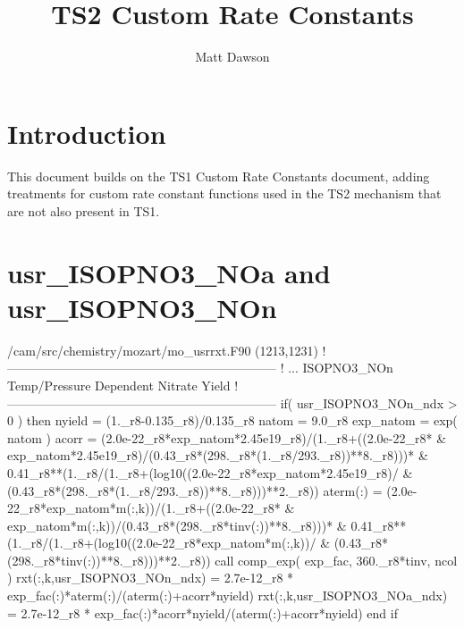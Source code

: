 \documentclass[titlepage]{article}
\begin{document}
\title{TS2 Custom Rate Constants}
\author{Matt Dawson}
\maketitle


\section{Introduction}

This document builds on the TS1 Custom Rate Constants document, adding treatments for custom rate constant
functions used in the TS2 mechanism that are not also present in TS1.



\section{usr\_ISOPNO3\_NOa and usr\_ISOPNO3\_NOn}

\begin{blockcode}[commandchars=\\\{\}]
\color{gray}/cam/src/chemistry/mozart/mo_usrrxt.F90 (1213,1231)
!-----------------------------------------------------------------
!       ... ISOPNO3_NOn Temp/Pressure Dependent Nitrate Yield
!-----------------------------------------------------------------
       if( usr_ISOPNO3_NOn_ndx > 0 ) then
          nyield = (1._r8-0.135_r8)/0.135_r8
          natom = 9.0_r8
          exp_natom = exp( natom )
          acorr = (2.0e-22_r8*exp_natom*2.45e19_r8)/(1._r8+((2.0e-22_r8* &
                      exp_natom*2.45e19_r8)/(0.43_r8*(298._r8*(1._r8/293._r8))**8._r8)))* &
                      0.41_r8**(1._r8/(1._r8+(log10((2.0e-22_r8*exp_natom*2.45e19_r8)/ &
                      (0.43_r8*(298._r8*(1._r8/293._r8))**8._r8)))**2._r8))
          aterm(:) = (2.0e-22_r8*exp_natom*m(:,k))/(1._r8+((2.0e-22_r8* &
                      exp_natom*m(:,k))/(0.43_r8*(298._r8*tinv(:))**8._r8)))* &
                      0.41_r8**(1._r8/(1._r8+(log10((2.0e-22_r8*exp_natom*m(:,k))/ &
                      (0.43_r8*(298._r8*tinv(:))**8._r8)))**2._r8))
          call comp_exp( exp_fac, 360._r8*tinv, ncol )
          rxt(:,k,usr_ISOPNO3_NOn_ndx) = 2.7e-12_r8 * exp_fac(:)*aterm(:)/(aterm(:)+acorr*nyield)
          rxt(:,k,usr_ISOPNO3_NOa_ndx) = 2.7e-12_r8 * exp_fac(:)*acorr*nyield/(aterm(:)+acorr*nyield)
       end if
\end{blockcode}
\end{document}
